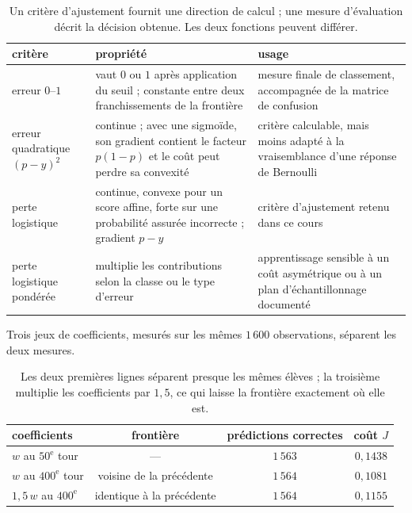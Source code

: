 \begin{table}[htbp]
\centering
\small
\begin{tabularx}{\textwidth}{
  >{\raggedright\arraybackslash}p{29mm}
  >{\raggedright\arraybackslash}p{49mm}
  >{\raggedright\arraybackslash}X}
\toprule
critère & propriété & usage \\
\midrule
erreur $0$--$1$ &
  vaut $0$ ou $1$ après application du seuil ; constante entre deux
  franchissements de la frontière &
  mesure finale de classement, accompagnée de la matrice de confusion \\
erreur quadratique $(p-y)^2$ &
  continue ; avec une sigmoïde, son gradient contient le facteur
  $p(1-p)$ et le coût peut perdre sa convexité &
  critère calculable, mais moins adapté à la vraisemblance d'une réponse
  de Bernoulli \\
perte logistique &
  continue, convexe pour un score affine, forte sur une probabilité assurée
  incorrecte ; gradient $p-y$ &
  critère d'ajustement retenu dans ce cours \\
perte logistique pondérée &
  multiplie les contributions selon la classe ou le type d'erreur &
  apprentissage sensible à un coût asymétrique ou à un plan
  d'échantillonnage documenté \\
\bottomrule
\end{tabularx}
\caption{Un critère d'ajustement fournit une direction de calcul ; une mesure
d'évaluation décrit la décision obtenue. Les deux fonctions peuvent différer.}
\label{tab:criteres-erreur}
\end{table}

Trois jeux de coefficients, mesurés sur les mêmes $1\,600$ observations, séparent
les deux mesures.

\begin{table}[htbp]
\centering
\begin{tabular}{lccc}
\toprule
coefficients & frontière & prédictions correctes & coût $J$ \\
\midrule
$w$ au $50^{\text{e}}$ tour    & \multicolumn{1}{c}{---}        & $1\,563$ & $0{,}1438$ \\
$w$ au $400^{\text{e}}$ tour   & voisine de la précédente       & $1\,564$ & $0{,}1081$ \\
$1{,}5\,w$ au $400^{\text{e}}$ & identique à la précédente      & $1\,564$ & $0{,}1155$ \\
\bottomrule
\end{tabular}
\caption{Les deux premières lignes séparent presque les mêmes élèves ; la
troisième multiplie les coefficients par $1{,}5$, ce qui laisse la frontière
exactement où elle est.}
\label{tab:comparaison}
\end{table}

